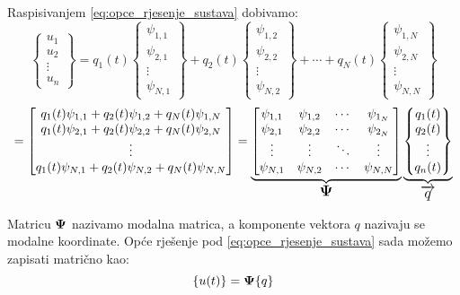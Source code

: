 Raspisivanjem \eqref{eq:opce_rjesenje_sustava} dobivamo:
\[
	\begin{Bmatrix}
		u_1\\
		u_2\\
		\vdots\\
		u_n
	\end{Bmatrix}
	=
	q_1(t)
	\begin{Bmatrix}
		\psi_{1,1}\\
		\psi_{2,1}\\
		\vdots\\
		\psi_{N,1}
	\end{Bmatrix}
	+
	q_2(t)
	\begin{Bmatrix}
		\psi_{1,2}\\
		\psi_{2,2}\\
		\vdots\\
		\psi_{N,2}
	\end{Bmatrix}
		+
		\cdots
		+
	q_N(t)
	\begin{Bmatrix}
		\psi_{1,N}\\
		\psi_{2,N}\\
		\vdots\\
		\psi_{N,N}
	\end{Bmatrix}
	\]
\[
	=
	\begin{bmatrix}
		q_1(t) \psi_{1,1} + q_2(t) \psi_{1,2} + q_N(t) \psi_{1,N} \\
		q_1(t) \psi_{2,1} + q_2(t) \psi_{2,2} + q_N(t) \psi_{2,N} \\
		\vdots \\
		q_1(t) \psi_{N,1} + q_2(t) \psi_{N,2} + q_N(t) \psi_{N,N}
	\end{bmatrix}
	=
	\underbrace{
	\begin{bmatrix}
		\psi_{1,1} & \psi_{1,2} & \cdots & \psi_{1_N} \\
		\psi_{2,1} & \psi_{2,2} & \cdots & \psi_{2_N} \\
		\vdots & \vdots & \ddots & \vdots \\
		\psi_{N,1} & \psi_{N,2} & \cdots & \psi_{N,N} 
	\end{bmatrix}
	}_{\text{\large{$\mathbf{\Psi}$}}}
	\underbrace{
	\begin{Bmatrix}
		q_1(t) \\
		q_2(t) \\
		\vdots \\
		q_n(t)
	\end{Bmatrix}
	}_{\text{\large{$\overrightarrow{q}$}}}
\]

Matricu $\mathbf{\Psi}$ nazivamo modalna matrica, a komponente vektora $q$ nazivaju se
modalne koordinate. Opće rješenje pod \eqref{eq:opce_rjesenje_sustava} sada možemo 
zapisati matrično kao:
\begin{equation}
    \vtor{u(t)}{} = \ppsi \vtor{q}{}
\end{equation}


